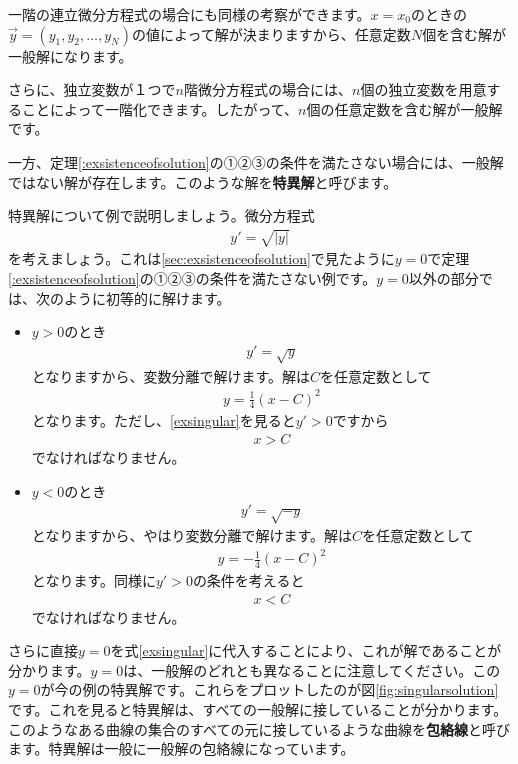 \documentclass[report,paper=a4, fontsize=12pt, line_length=16cm, number_of_lines=33,dvipdfmx]{jlreq}
\numberwithin{equation}{section}
\newcommand{\strong}[1]{\textsf{\bfseries #1}}
\newcommand{\yv}{\vec{y}}
\begin{document}
一階の連立微分方程式の場合にも同様の考察ができます。$x=x_0$のときの$\yv=(y_1,y_2,\dots,y_N)$の値によって解が決まりますから、任意定数$N$個を含む解が一般解になります。

さらに、独立変数が１つで$n$階微分方程式の場合には、$n$個の独立変数を用意することによって一階化できます。したがって、$n$個の任意定数を含む解が一般解です。

一方、定理\ref{:exsistenceofsolution}の①②③の条件を満たさない場合には、一般解ではない解が存在します。このような解を\strong{特異解}と呼びます。

特異解について例で説明しましょう。微分方程式
\begin{align}
  y'=\sqrt{|y|}\label{exsingular}
\end{align}
を考えましょう。これは\ref{sec:exsistenceofsolution}で見たように$y=0$で定理\ref{:exsistenceofsolution}の①②③の条件を満たさない例です。$y=0$以外の部分では、次のように初等的に解けます。
\begin{itemize}
  \item $y>0$のとき
  \begin{align}
    y'=\sqrt{y}
  \end{align}
  となりますから、変数分離で解けます。解は$C$を任意定数として
  \begin{align}
    y=\frac{1}{4}(x-C)^2
  \end{align}
  となります。ただし、\eqref{exsingular}を見ると$y'>0$ですから
  \begin{align}
    x>C
  \end{align}
  でなければなりません。
  \item $y<0$のとき
  \begin{align}
    y'=\sqrt{-y}
  \end{align}
  となりますから、やはり変数分離で解けます。解は$C$を任意定数として
  \begin{align}
    y=-\frac{1}{4}(x-C)^2
  \end{align}
  となります。同様に$y'>0$の条件を考えると
  \begin{align}
    x<C
  \end{align}
  でなければなりません。
\end{itemize}
さらに直接$y=0$を式\eqref{exsingular}に代入することにより、これが解であることが分かります。$y=0$は、一般解のどれとも異なることに注意してください。この$y=0$が今の例の特異解です。これらをプロットしたのが図\ref{fig:singularsolution}です。これを見ると特異解は、すべての一般解に接していることが分かります。このようなある曲線の集合のすべての元に接しているような曲線を\strong{包絡線}と呼びます。特異解は一般に一般解の包絡線になっています。
\end{document}
